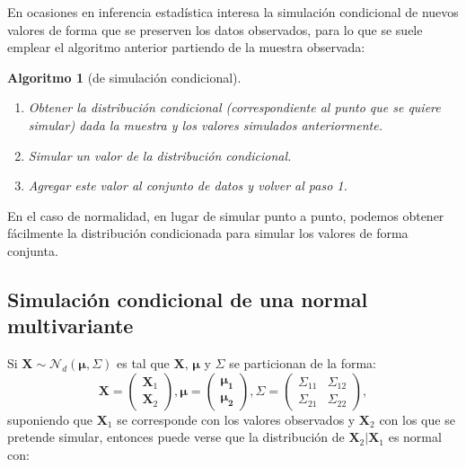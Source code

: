 \documentclass[
  10pt,
]{book}
\renewcommand{\boldsymbol}[1]{\symbf{#1}}
\renewcommand{\mathbf}[1]{\symbf{#1}}
\theoremstyle{break}
\newtheorem{conjecture}{Algoritmo}[chapter]
\theoremstyle{nonumberplain}
\begin{document}
En ocasiones en inferencia estadística interesa la simulación condicional de nuevos valores de forma que se preserven los datos observados, para lo que se suele emplear el algoritmo anterior partiendo de la muestra observada:

\begin{conjecture}[de simulación condicional]
\protect\hypertarget{cnj:cond-incond}{}\label{cnj:cond-incond}

\begin{enumerate}
\def\labelenumi{\arabic{enumi}.}
\item
  Obtener la distribución condicional (correspondiente al punto
  que se quiere simular) dada la muestra y los valores simulados
  anteriormente.
\item
  Simular un valor de la distribución condicional.
\item
  Agregar este valor al conjunto de datos y volver al paso 1.
\end{enumerate}

\end{conjecture}

En el caso de normalidad, en lugar de simular punto a punto,
podemos obtener fácilmente la distribución condicionada
para simular los valores de forma conjunta.

\hypertarget{condnormal}{%
\subsection{Simulación condicional de una normal multivariante}\label{condnormal}}

Si \(\mathbf{X} \sim \mathcal{N}_d\left( \boldsymbol{\mu},\Sigma \right)\) es tal que \(\mathbf{X}\), \(\boldsymbol{\mu}\) y \(\Sigma\) se particionan de la forma:
\[\mathbf{X} =
\begin{pmatrix}
 \mathbf{X}_1 \\
 \mathbf{X}_2
\end{pmatrix},  
\boldsymbol{\mu} =
\begin{pmatrix}
 \boldsymbol{\mu_1} \\
 \boldsymbol{\mu_2}
\end{pmatrix}, 
\Sigma =
\begin{pmatrix}
 \Sigma_{11} & \Sigma_{12} \\
 \Sigma_{21} & \Sigma_{22}
\end{pmatrix},\]
suponiendo que \(\mathbf{X}_1\) se corresponde con los valores observados y \(\mathbf{X}_2\) con los que se pretende simular,
entonces puede verse \citep[e.g.][]{ripley1987stochastic} que la distribución de \(\mathbf{X}_2 | \mathbf{X}_1\) es normal con:
\end{document}
